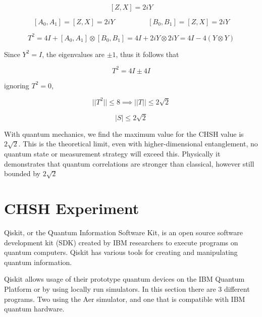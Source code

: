\documentclass[12pt]{article}
\begin{document}
$$
[Z,X] = 2iY
$$

$$
[A_0, A_1] = [Z,X] = 2iY \hspace{2cm} [B_0, B_1] = [Z,X] = 2iY
$$

$$
T^2 = 4I + [A_0, A_1] \otimes [B_0, B_1] = 4I + 2iY \otimes 2iY = 4I - 4(Y \otimes Y)
$$

Since $Y^2 = I$, the eigenvalues are $\pm1$, thus it follows that

$$
T^2 = 4I \pm4I
$$

ignoring $T^2 = 0$,

$$
||T^2|| \leq 8 \implies ||T|| \leq 2\sqrt{2}
$$

$$
|S| \leq 2\sqrt{2}
$$

With quantum mechanics, we find the maximum value for the CHSH value is $2\sqrt{2}$. This is the theoretical limit, even with higher-dimensional entanglement, no quantum state or measurement strategy will exceed this. Physically it demonstrates that quantum correlations are stronger than classical, however still bounded by $2\sqrt{2}$




\newpage
\section{CHSH Experiment}
Qiskit, or the Quantum Information Software Kit, is an open source software development kit (SDK) created by IBM researchers to execute programs on quantum computers.
Qiskit has various tools for creating and manipulating quantum information. 

Qiskit allows usage of their prototype quantum devices on the IBM Quantum Platform or by using locally run simulators. In this section there are 3 different programs. Two using the Aer simulator, and one that is compatible with IBM quantum hardware. 
\end{document}
